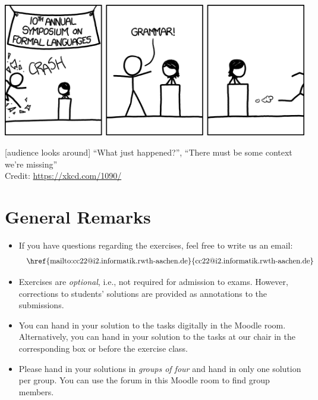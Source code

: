\documentclass[a4paper]{article}
\begin{document}

\begin{onlysolution}
  \begin{center}
    \includegraphics[scale=0.5]{xkcd_formal_languages}

    [audience looks around] ``What just happened?'', ``There must be some context we're missing'' \\[0.5em]

    \scriptsize Credit: \href{https://xkcd.com/1090/}{https://xkcd.com/1090/}
  \end{center}
\end{onlysolution}

\section*{General Remarks}
\begin{itemize}
  \item If you have questions regarding the exercises, feel free to write us an email:
  \[\text{   \href{mailto:cc22@i2.informatik.rwth-aachen.de}{cc22@i2.informatik.rwth-aachen.de}}
  \]
  \item Exercises are \emph{optional}, i.e., not required for admission to exams. However, corrections to students’ solutions are provided as annotations to the submissions.
  \item You can hand in your solution to the tasks digitally in the Moodle room. Alternatively, you can hand in your solution to the tasks at our chair in the corresponding box or before the exercise class.
  \item Please hand in your solutions in \emph{groups of four} and hand in only one solution per group. You can use the forum in this Moodle room to find group members.
\end{itemize}



%

%
%
\end{document}
